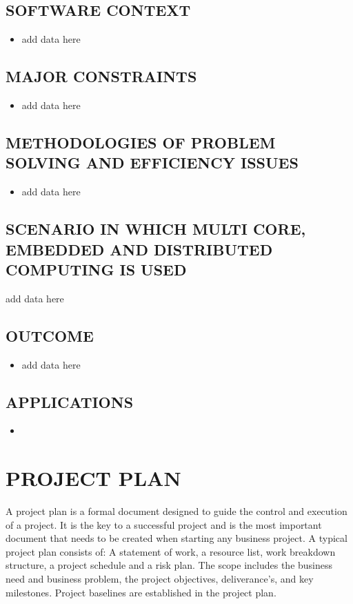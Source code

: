\documentclass[12pt,a4paper]{report}
\begin{document}
\section{SOFTWARE CONTEXT}
\begin{itemize}
    \item add data here
\end{itemize}

\section{MAJOR CONSTRAINTS}
\begin{itemize}
\item add data here
\end{itemize}

\section{METHODOLOGIES OF PROBLEM SOLVING AND EFFICIENCY ISSUES}
\begin{itemize}
\item add data here
\end{itemize}

\section{SCENARIO IN WHICH MULTI CORE, EMBEDDED AND DISTRIBUTED COMPUTING IS USED}
add data here
\section{OUTCOME}
\begin{itemize}
\item add data here
\end{itemize}

\section{APPLICATIONS}
\begin{itemize}
\item 
\end{itemize}

\chapter{PROJECT PLAN}
A project plan is a formal document designed to guide the control and execution of a project. It is the key to a successful project and is the most important document that needs to be created when starting any business project. A typical project plan consists of: A statement of work, a resource list, work breakdown structure, a project schedule and a risk plan. The scope includes the business need and business problem, the project objectives, deliverance's, and key milestones. Project baselines are established in the project plan. 
\end{document}
